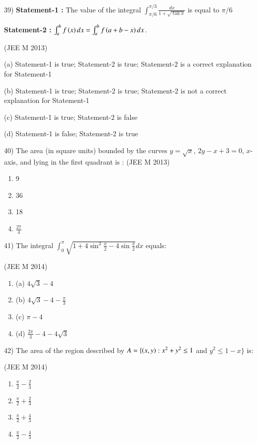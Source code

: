 \documentclass[journal,12pt,twocolumn]{IEEEtran}
\theoremstyle{remark}
\begin{document}
39)
	 \textbf{Statement-1 :} The value of the integral $\int_{\pi/6}^{\pi/3}\frac{dx}{1+\sqrt{\tan x}}$ is equal to $\pi/6$

		\textbf{Statement-2 :} $\int_a^bf\left(x\right)dx=\int_a^bf\left(a+b-x\right)dx$.

		\hfill{(JEE M 2013)}
		
		(a) Statement-1 is true; Statement-2 is true; Statement-2 is a correct explanation for Statement-1

		(b) Statement-1 is true; Statement-2 is true; Statement-2 is not a correct explanation for Statement-1

		(c) Statement-1 is true; Statement-2 is false

		(d) Statement-1 is false; Statement-2 is true

40)
	 The area (in square units) bounded by the curves $y=\sqrt{x}$, $2y-x+3=0$, $x$-axis, and lying in the first quadrant is :
		\hfill{(JEE M 2013)}

		\begin{multicols}{4}
			\begin{enumerate}[label=(\alph*)]
		\item 9
		\item 36
		\item 18
		\item $\frac{27}{4}$
			\end{enumerate}
		\end{multicols}


41)
	 The integral $\int_0^{\pi}\sqrt{1+4\sin ^2\frac{x}{2}-4\sin \frac{x}{2}}dx$ equals:

		\hfill{(JEE M 2014)}

		\begin{multicols}{2}
			\begin{enumerate}[label=(\alph*)]
				\item (a) $4\sqrt{3}-4$
				\item (b) $4\sqrt{3}-4-\frac{\pi}{3}$
				\item (c) $\pi-4$
				\item (d) $\frac{2\pi}{3}-4-4\sqrt{3}$
			\end{enumerate}
		\end{multicols}

42)
	 The area of the region described by $A=\{\left(x,y\right):x^2+y^2\leq1$ and $y^2\leq1-x\}$ is:

		\hfill{(JEE M 2014)}

		\begin{multicols}{4}
			\begin{enumerate}[label=(\alph*)]
				\item $\frac{\pi}{2}-\frac{2}{3}$
				\item $\frac{\pi}{2}+\frac{2}{3}$
				\item $\frac{\pi}{2}+\frac{4}{3}$
				\item $\frac{\pi}{2}-\frac{4}{3}$
			\end{enumerate}
		\end{multicols}
\end{document}
